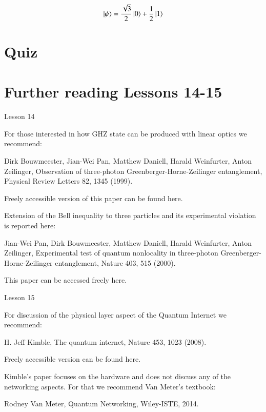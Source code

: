 \newpage
\begin{exercises}
\begin{equation*}
\ket{\psi} = \frac{\sqrt{3}}{2}\ket{0} + \frac{1}{2}\ket{1}
\end{equation*}


\end{exercises}


\newpage
\section{Quiz}


\section{Further reading Lessons 14-15}

Lesson 14

For those interested in how GHZ state can be produced with linear optics we recommend:

Dirk Bouwmeester, Jian-Wei Pan, Matthew Daniell, Harald Weinfurter, Anton Zeilinger, Observation of three-photon Greenberger-Horne-Zeilinger entanglement, Physical Review Letters 82, 1345 (1999).

Freely accessible version of this paper can be found here.

Extension of the Bell inequality to three particles and its experimental violation is reported here:

Jian-Wei Pan, Dirk Bouwmeester, Matthew Daniell, Harald Weinfurter, Anton Zeilinger, Experimental test of quantum nonlocality in three-photon Greenberger-Horne-Zeilinger entanglement, Nature 403, 515 (2000).

This paper can be accessed freely here.

Lesson 15

For discussion of the physical layer aspect of the Quantum Internet we recommend:

H. Jeff Kimble, The quantum internet, Nature 453, 1023 (2008).

Freely accessible version can be found here.

Kimble’s paper focuses on the hardware and does not discuss any of the networking aspects. For that we recommend Van Meter’s textbook:

Rodney Van Meter, Quantum Networking, Wiley-ISTE, 2014.
